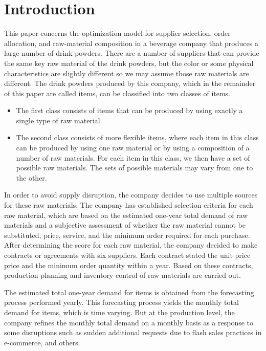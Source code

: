 \documentclass[preprint, 3p,
authoryear]{elsarticle} %
\providecommand{\tightlist}{%
  \setlength{\itemsep}{0pt}\setlength{\parskip}{0pt}}
\begin{document}
\hypertarget{introduction}{%
\section{Introduction}\label{introduction}}

This paper concerns the optimization model for supplier selection, order
allocation, and raw-material composition in a beverage company that
produces a large number of drink powders. There are a number of
suppliers that can provide the same key raw material of the drink
powders, but the color or some physical characteristics are slightly
different so we may assume those raw materials are different. The drink
powders produced by this company, which in the remainder of this paper
are called items, can be classified into two classes of items.

\begin{itemize}
\tightlist
\item
  The first class consists of items that can be produced by using
  exactly a single type of raw material.
\item
  The second class consists of more flexible items, where each item in
  this class can be produced by using one raw material or by using a
  composition of a number of raw materials. For each item in this class,
  we then have a set of possible raw materials. The sets of possible
  materials may vary from one to the other.
\end{itemize}

In order to avoid supply disruption, the company decides to use multiple
sources for these raw materials. The company has established selection
criteria for each raw material, which are based on the estimated
one-year total demand of raw materials and a subjective assessment of
whether the raw material cannot be substituted, price, service, and the
minimum order required for each purchase. After determining the score
for each raw material, the company decided to make contracts or
agreements with six suppliers. Each contract stated the unit price price
and the minimum order quantity within a year. Based on these contracts,
production planning and inventory control of raw materials are carried
out.

The estimated total one-year demand for items is obtained from the
forecasting process performed yearly. This forecasting process yields
the monthly total demand for items, which is time varying. But at the
production level, the company refines the monthly total demand on a
monthly basis as a response to some disruptions such as sudden
additional requests due to flash sales practices in e-commerce, and
others.
\end{document}
